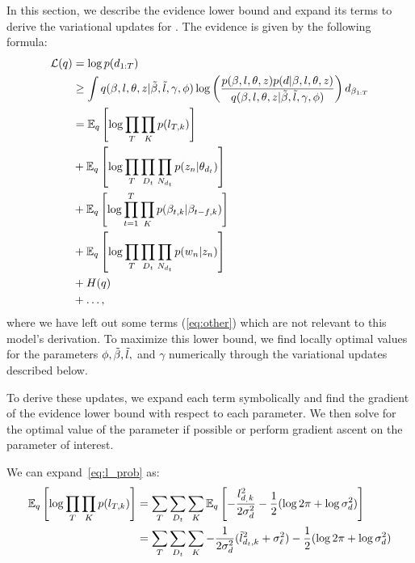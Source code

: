 \label{sec:docinf_appendix}
In this section, we describe the evidence lower bound and expand its
terms to derive the variational updates for .  The
evidence is given by the following formula:
\begin{align}
\label{eq:supplementary_docinf_elbo}
\mathcal{L}(q) &= \log p(\textbf{$d_{1:T}$}) \\
            &\ge \int q( \beta, l, \theta, z | \tilde{\beta}, \tilde{l}, \gamma, \phi)
                    \log \left(\frac{p(\beta, l, \theta, z)
		                     p(d | \beta, l, \theta, z)}
			 {q( \beta, l, \theta, z | \tilde{\beta}, \tilde{l}, \gamma, \phi)}
                    \right)
		    d_{\beta_{1:T}} \\
            & = \mathbb{E}_q\left[ \log \prod_T \prod_K p(l_{T,k}) \right] \label{eq:l_prob} \\
            & + \mathbb{E}_q\left[ \log \prod_T \prod_{D_t} \prod_{N_{d_t}} p(z_n | \theta_{d_t}) \right] \label{eq:z_prob} \\
            & + \mathbb{E}_q\left[ \log \prod_{t=1}^T \prod_K p(\beta_{t,k}
                                 		      | \beta_{t-f,k}) \right]
    \label{eq:beta_prob} \\
            & + \mathbb{E}_q\left[ \log \prod_T \prod_{D_t} \prod_{N_{d_t}} p(w_n | z_n) \right] \label{eq:w_prob} \\
            & + H(q) \\
            & + \ldots \label{eq:other},
\end{align}
where we have left out some terms (\ref{eq:other}) which are not
relevant to this model's derivation.  To maximize this lower bound, we
find locally optimal values for the parameters $\phi, \tilde{\beta}, \tilde{l},$ and
$\gamma$ numerically through the variational updates described below.

To derive these updates, we expand each term symbolically and find the
gradient of the evidence lower bound with respect to each parameter.
We then solve for the optimal value of the parameter if possible or
perform gradient ascent on the parameter of interest.  

We can expand~\ref{eq:l_prob} as:
\begin{align}
  \mathbb{E}_q\left[ \log \prod_T \prod_K p(l_{T,k}) \right]
  & = \sum_T \sum_{D_t} \sum_K \mathbb{E}_q\left[-\frac{l_{d_,k}^2}{2 \sigma^2_{d}} - \frac{1}{2} (\log 2 \pi + \log \sigma^2_{d}) \right]  \\ \nonumber
  & = \sum_T \sum_{D_t} \sum_K -\frac{1}{2 \sigma^2_{d}} (\tilde{l}_{d_t,k}^2 + {\sigma^2_{\ell}}) - \frac{1}{2} (\log 2 \pi + \log \sigma^2_{d}) \nonumber
\end{align}

